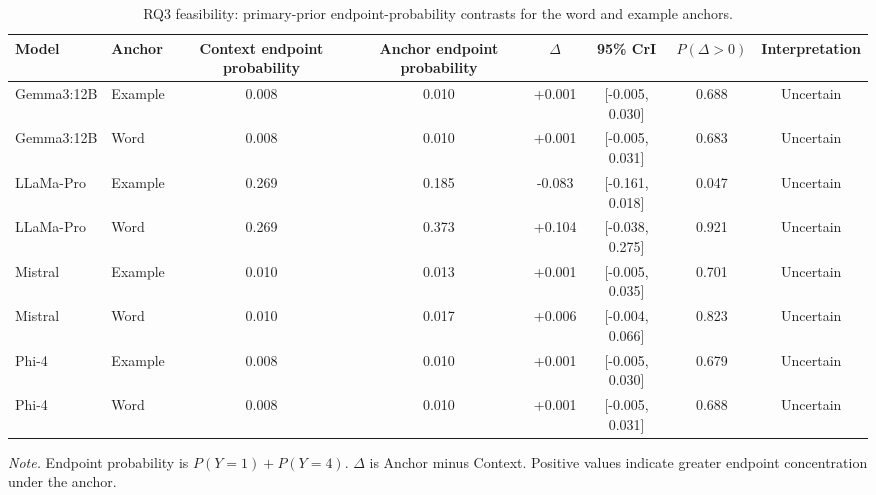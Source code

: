\begin{table}[tbp]
\caption{RQ3 feasibility: primary-prior endpoint-probability contrasts for the word and example anchors.}
\label{tab:rq3_feasibility_extremity_appendix}
\begin{tabular}{llcccccc}
\toprule
Model & Anchor & Context endpoint probability & Anchor endpoint probability & $\Delta$ & 95\% CrI & $P(\Delta>0)$ & Interpretation \\
\midrule
Gemma3:12B & Example & 0.008 & 0.010 & +0.001 & [-0.005, 0.030] & 0.688 & Uncertain \\
Gemma3:12B & Word & 0.008 & 0.010 & +0.001 & [-0.005, 0.031] & 0.683 & Uncertain \\
LLaMa-Pro & Example & 0.269 & 0.185 & -0.083 & [-0.161, 0.018] & 0.047 & Uncertain \\
LLaMa-Pro & Word & 0.269 & 0.373 & +0.104 & [-0.038, 0.275] & 0.921 & Uncertain \\
Mistral & Example & 0.010 & 0.013 & +0.001 & [-0.005, 0.035] & 0.701 & Uncertain \\
Mistral & Word & 0.010 & 0.017 & +0.006 & [-0.004, 0.066] & 0.823 & Uncertain \\
Phi-4 & Example & 0.008 & 0.010 & +0.001 & [-0.005, 0.030] & 0.679 & Uncertain \\
Phi-4 & Word & 0.008 & 0.010 & +0.001 & [-0.005, 0.031] & 0.688 & Uncertain \\
\bottomrule
\end{tabular}
\vspace{2pt}
\begin{minipage}{\linewidth}
\footnotesize\textit{Note.} Endpoint probability is $P(Y=1)+P(Y=4)$. $\Delta$ is Anchor minus Context. Positive values indicate greater endpoint concentration under the anchor.
\end{minipage}
\end{table}
